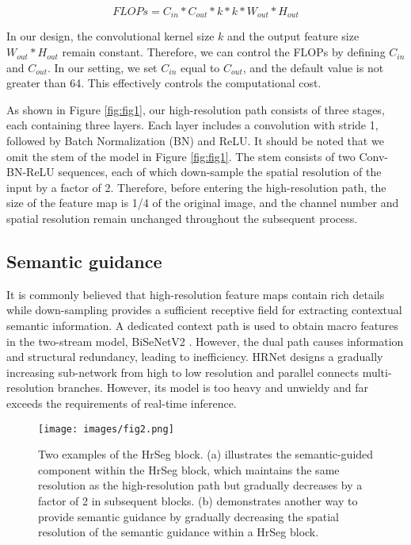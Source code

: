 \documentclass[preprint,12pt,authoryear]{elsarticle}
\begin{document}
\begin{equation}
    FLOPs = C_{in} * C_{out} * k * k * W_{out} * H_{out} \label{eq:conv_flops}
\end{equation}

In our design, the convolutional kernel size $k$ and the output feature size $W_{out}*H_{out}$ remain constant. Therefore, we can control the FLOPs by defining $C_{in}$ and $C_{out}$. In our setting, we set $C_{in}$ equal to  $C_{out}$, and the default value is not greater than 64. This effectively controls the computational cost.

As shown in Figure \ref{fig:fig1}, our high-resolution path consists of three stages, each containing three layers. Each layer includes a convolution with stride 1, followed by Batch Normalization (BN) and ReLU. It should be noted that we omit the stem of the model in Figure \ref{fig:fig1}. The stem consists of two Conv-BN-ReLU sequences, each of which down-sample the spatial resolution of the input by a factor of 2. Therefore, before entering the high-resolution path, the size of the feature map is 1/4 of the original image, and the channel number and spatial resolution remain unchanged throughout the subsequent process.

\subsection{Semantic guidance}
\label{subsec:Semanticguidance}

It is commonly believed that high-resolution feature maps contain rich details while down-sampling provides a sufficient receptive field for extracting contextual semantic information.
A dedicated context path is used to obtain macro features in the two-stream model, BiSeNetV2 \citep{yu_bisenet_2020}. However, the dual path causes information and structural redundancy, leading to inefficiency. HRNet \citep{wang_deep_2020} designs a gradually increasing sub-network from high to low resolution and parallel connects multi-resolution branches. However, its model is too heavy and unwieldy and far exceeds the requirements of real-time inference.

\begin{figure}[t]
    \centering
    \texttt{[image: images/fig2.png]}
    \caption{Two examples of the HrSeg block. (a) illustrates the semantic-guided component within the HrSeg block, which maintains the same resolution as the high-resolution path but gradually decreases by a factor of 2 in subsequent blocks. (b) demonstrates another way to provide semantic guidance by gradually decreasing the spatial resolution of the semantic guidance within a HrSeg block. }
    \label{fig:fig2}
\end{figure}
\end{document}

